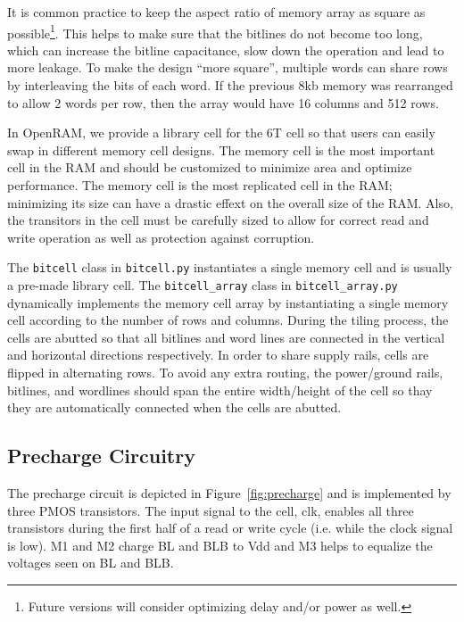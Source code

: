 It is common practice to keep the aspect ratio of memory array as
square as possible\footnote{Future versions will consider optimizing
  delay and/or power as well.}.  This helps to make sure that the
bitlines do not become too long, which can increase the bitline
capacitance, slow down the operation and lead to more leakage.  To
make the design ``more square'', multiple words can share rows by
interleaving the bits of each word.  If the previous 8kb memory was
rearranged to allow 2 words per row, then the array would have 16
columns and 512 rows.  

In OpenRAM, we provide a library cell for the 6T cell so that users
can easily swap in different memory cell designs.  The memory cell is
the most important cell in the RAM and should be customized to
minimize area and optimize performance.  The memory cell is the most
replicated cell in the RAM; minimizing its size can have a drastic
effext on the overall size of the RAM.  Also, the transitors in the cell
must be carefully sized to allow for correct read and write operation
as well as protection against corruption.

The \verb|bitcell| class in \verb|bitcell.py| instantiates a single
memory cell and is usually a pre-made library cell. The
\verb|bitcell_array| class in \verb|bitcell_array.py| dynamically
implements the memory cell array by instantiating a single memory cell
according to the number of rows and columns.  During the tiling
process, the cells are abutted so that all bitlines and word lines are
connected in the vertical and horizontal directions respectively.  In
order to share supply rails, cells are flipped in alternating rows. To
avoid any extra routing, the power/ground rails, bitlines, and
wordlines should span the entire width/height of the cell so thay they
are automatically connected when the cells are abutted.


\subsection{Precharge Circuitry}
\label{sec:precharge}

The precharge circuit is depicted in Figure~\ref{fig:precharge} and is
implemented by three PMOS transistors. The input signal to the cell,
clk, enables all three transistors during the first half of a read or
write cycle (i.e. while the clock signal is low).  M1 and M2 charge BL
and BLB to Vdd and M3 helps to equalize the voltages seen on BL and
BLB.

